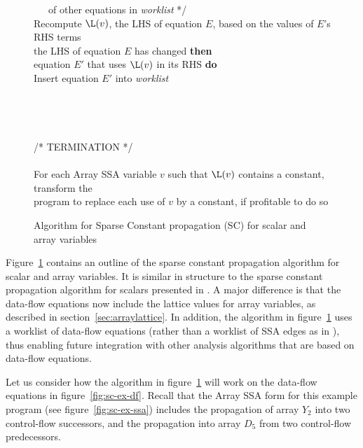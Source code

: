 \begin{figure}
\begin{center}
\begin{programa}
\Tb ~~~of other equations in {\it worklist} */ \\
\Tb Recompute $\L(v)$, the LHS of equation $E$, based on the values of $E$'s RHS terms\\
 the LHS of equation $E$ has changed {\bf then}\\
 equation $E'$ that uses $\L(v)$ in its RHS {\bf do}\\
\Td Insert equation $E'$ into {\it worklist}\\
\\
\\
 \\
\\
/* TERMINATION */\\
\\
\Ta For each Array SSA variable $v$ such that $\L(v)$ contains a constant, transform the \\ 
\Ta program to replace each use of $v$ by a constant, if profitable to do so
\end{programa}
\end{center}
\caption{Algorithm for Sparse Constant propagation (SC) for scalar and array variables}
\label{fig:sc-alg}
\end{figure}

Figure~\ref{fig:sc-alg} contains an outline of the sparse constant
propagation algorithm for scalar and array variables.  It is similar in
structure to the sparse constant propagation algorithm for scalars
presented in \cite{WZ91}.  A major difference is that the data-flow
equations now include the lattice values for array variables, as
described in section~\ref{sec:arraylattice}.
In addition, the algorithm in figure~\ref{fig:sc-alg} uses a worklist
of data-flow equations (rather than a worklist of SSA edges as in \cite{WZ91}), thus enabling future integration with other analysis algorithms that are
based on data-flow equations.

Let us consider how the algorithm in figure~\ref{fig:sc-alg}
will work on the data-flow equations in figure~\ref{fig:sc-ex-df}.
Recall that the Array SSA form for this example program 
(see figure~\ref{fig:sc-ex-ssa})
includes the propagation of array $Y_2$ into two control-flow successors, and the propagation into array $D_5$
from two control-flow
predecessors. 


